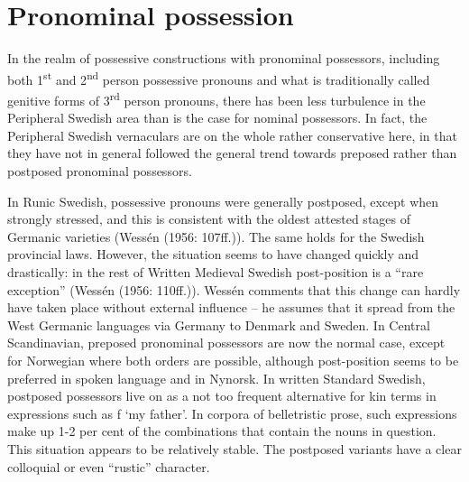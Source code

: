 {%

\section{Pronominal possession}

In the realm of possessive constructions with pronominal possessors, including both 1\textsuperscript{st} and 2\textsuperscript{nd} person possessive pronouns and what is traditionally called genitive forms of 3\textsuperscript{rd} person pronouns, there has been less turbulence in the Peripheral Swedish area than is the case for nominal possessors. In fact, the Peripheral Swedish vernaculars are on the whole rather conservative here, in that they have not in general followed the general trend towards preposed rather than postposed pronominal possessors. 


In Runic Swedish, possessive pronouns were generally postposed, except when strongly stressed, and this is consistent with the oldest attested stages of Germanic varieties (Wessén (1956: 107ff.)). The same holds for the Swedish provincial laws. However, the situation seems to have changed quickly and drastically: in the rest of Written Medieval Swedish post-position is a “rare exception” (Wessén (1956: 110ff.)). Wessén comments that this change can hardly have taken place without external influence – he assumes that it spread from the West Germanic languages via Germany to Denmark and Sweden. In Central Scandinavian, preposed pronominal possessors are now the normal case, except for Norwegian where both orders are possible, although post-position seems to be preferred in spoken language and in Nynorsk. In written Standard Swedish, postposed possessors live on as a not too frequent alternative for kin terms in expressions such as f ‘my father’. In corpora of belletristic prose, such expressions make up 1-2 per cent of the combinations that contain the nouns in question. This situation appears to be relatively stable. The postposed variants have a clear colloquial or even “rustic” character. 


}
